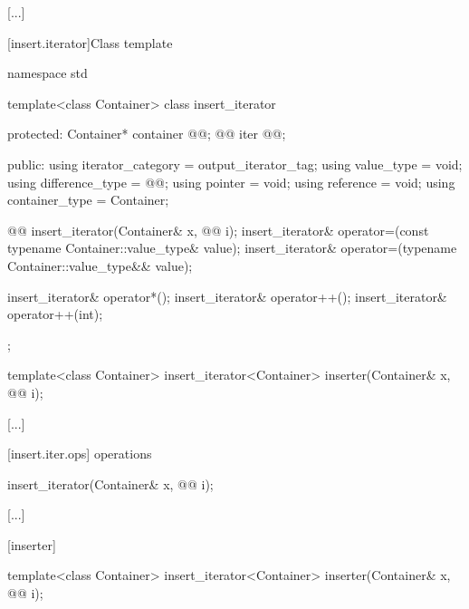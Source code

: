 [...]

[insert.iterator]{Class template }


%
\begin{codeblock}
namespace std {
  template<class Container>
  class insert_iterator {
  protected:
    Container* container @@;
    @@ iter @\newtxt{\{\}}@;

  public:
    using iterator_category = output_iterator_tag;
    using value_type        = void;
    using difference_type   = @@;
    using pointer           = void;
    using reference         = void;
    using container_type    = Container;

    @@
    insert_iterator(Container& x, @@ i);
    insert_iterator& operator=(const typename Container::value_type& value);
    insert_iterator& operator=(typename Container::value_type&& value);

    insert_iterator& operator*();
    insert_iterator& operator++();
    insert_iterator& operator++(int);
  };

  template<class Container>
    insert_iterator<Container> inserter(Container& x, @@ i);
}
\end{codeblock}

[...]

[insert.iter.ops]{ operations}

%
\begin{itemdecl}
insert_iterator(Container& x, @@ i);
\end{itemdecl}

[...]

[inserter]{}

%
\begin{itemdecl}
template<class Container>
  insert_iterator<Container> inserter(Container& x, @@ i);
\end{itemdecl}

